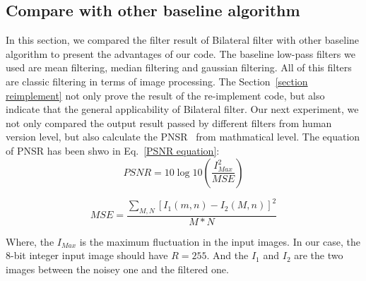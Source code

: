 \documentclass[12pt]{article}
\begin{document}
\subsection{Compare with other baseline algorithm}
\label{baseline comparison}
In this section, we compared the filter result of Bilateral filter with other baseline algorithm to present the advantages of our code.
The baseline low-pass filters we used are mean filtering, median filtering and gaussian filtering. 
All of this filters are classic filtering in terms of image processing.
The Section~\ref{section reimplement} not only prove the result of the re-implement code, but also indicate that the general applicability of Bilateral filter.
Our next experiment, we not only compared the output result passed by different filters from human version level, but also calculate the PNSR~\cite{paper_psnr} from mathmatical level. 
The equation of PNSR has been shwo in Eq.~\ref{PSNR equation}:
\begin{equation}
  PSNR = 10\log 10 (\frac{I_{Max}^{2}}{MSE})
  \label{PSNR equation}
\end{equation}

\begin{equation}
  MSE = \frac{\sum_{M, N}[I_1(m,n) - I_2(M, n)]^2}{M * N}
  \label{MSE}
\end{equation}

Where, the $I_{Max}$ is the maximum fluctuation in the input images. 
In our case, the 8-bit integer input image should have $R = 255$.
And the $I_1$ and $I_2$ are the two images between the noisey one and the filtered one.
  
\end{document}
